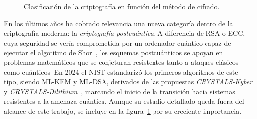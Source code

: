 \begin{figure}[H]
\centering
\begin{lrbox}{\arqbox}%
%
\end{lrbox}%
\resizebox{\textwidth}{!}{\usebox{\arqbox}}%
\caption{Clasificación de la criptografía en función del método de cifrado.}
\label{fig:clasificacion_criptografia}
\end{figure}

En los últimos años ha cobrado relevancia una nueva categoría dentro de la 
criptografía moderna: la \emph{criptografía postcuántica}. A diferencia de RSA o ECC, 
cuya seguridad se vería comprometida por un ordenador cuántico capaz de ejecutar el algoritmo de 
Shor~\cite{shor-quantum-threat}, los esquemas postcuánticos se apoyan en problemas matemáticos 
que se conjeturan resistentes tanto a ataques clásicos como cuánticos. En 2024 el NIST estandarizó 
los primeros algoritmos de este tipo, siendo ML-KEM y ML-DSA, derivados de las propuestas \emph{CRYSTALS-Kyber} 
y \emph{CRYSTALS-Dilithium}~\cite{nist-fips203}, marcando el inicio de la transición hacia 
sistemas resistentes a la amenaza cuántica. Aunque su estudio detallado queda fuera del alcance de este trabajo, 
se incluye en la figura~\ref{fig:clasificacion_criptografia} por su creciente importancia.

